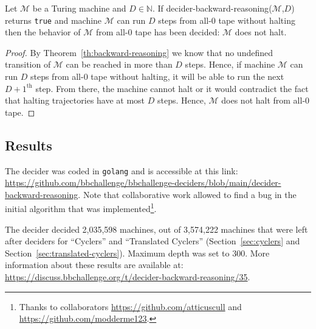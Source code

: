\begin{corollary}
  Let $\mathcal{M}$ be a Turing machine and $D\in\mathbb{N}$. If {\sc decider-backward-reasoning}($\mathcal{M}$,$D$) returns \texttt{true} and machine $\mathcal{M}$ can run $D$ steps from all-0 tape without halting then the behavior of $\mathcal{M}$ from all-0 tape has been decided: $\mathcal{M}$ does not halt.
\end{corollary}
\begin{proof}
  By Theorem~\ref{th:backward-reasoning} we know that no undefined transition of $\mathcal{M}$ can be reached in more than $D$ steps. Hence, if machine $\mathcal{M}$ can run $D$ steps from all-0 tape without halting, it will be able to run the next $D+1^{\text{th}}$ step. From there, the machine cannot halt or it would contradict the fact that halting trajectories have at most $D$ steps. Hence, $\mathcal{M}$ does not halt from all-0 tape.
\end{proof}

\subsection{Results}\label{sec:backward-reasoning-results}

The decider was coded in \texttt{golang} and is accessible at this link: \url{https://github.com/bbchallenge/bbchallenge-deciders/blob/main/decider-backward-reasoning}. Note that collaborative work allowed to find a bug in the initial algorithm that was implemented\footnote{Thanks to collaborators \url{https://github.com/atticuscull} and \url{https://github.com/modderme123}.}.

The decider decided 2,035,598 machines, out of 3,574,222 machines that were left after deciders for ``Cyclers'' and ``Translated Cyclers'' (Section~\ref{sec:cyclers} and Section~\ref{sec:translated-cyclers}). Maximum depth was set to 300. More information about these results are available at: \url{https://discuss.bbchallenge.org/t/decider-backward-reasoning/35}.
